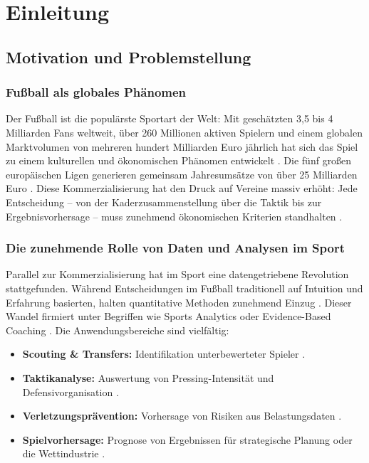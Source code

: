 \chapter{Einleitung}\label{chap:einleitung}

\section{Motivation und Problemstellung}

\subsection{Fußball als globales Phänomen}

Der Fußball ist die populärste Sportart der Welt: Mit geschätzten 3,5 bis
4 Milliarden Fans weltweit, über 260 Millionen aktiven Spielern und einem
globalen Marktvolumen von mehreren hundert Milliarden Euro jährlich hat
sich das Spiel zu einem kulturellen und ökonomischen Phänomen entwickelt
\cite{Szymanski2003,Statista2024}. Die fünf großen europäischen Ligen
generieren gemeinsam Jahresumsätze von über 25 Milliarden Euro
\cite{DFL2024}. Diese Kommerzialisierung hat den Druck auf Vereine massiv
erhöht: Jede Entscheidung -- von der Kaderzusammenstellung über die Taktik
bis zur Ergebnisvorhersage -- muss zunehmend ökonomischen Kriterien
standhalten \cite{DobsonGoddard2011}.

\subsection{Die zunehmende Rolle von Daten und Analysen im Sport}

Parallel zur Kommerzialisierung hat im Sport eine datengetriebene Revolution
stattgefunden. Während Entscheidungen im Fußball traditionell auf Intuition
und Erfahrung basierten, halten quantitative Methoden zunehmend Einzug
\cite{ReinMemmert2016}. Dieser Wandel firmiert unter Begriffen wie
\glqq Sports Analytics\grqq{} oder \glqq Evidence-Based Coaching\grqq{}
\cite{BunkerThabtah2019}. Die Anwendungsbereiche sind vielfältig:

\begin{itemize}
    \item \textbf{Scouting \& Transfers:} Identifikation unterbewerteter
          Spieler \cite{PappalardoEtAl2019}.
    \item \textbf{Taktikanalyse:} Auswertung von Pressing-Intensität und
          Defensivorganisation \cite{MemmertLemminkSampaio2017}.
    \item \textbf{Verletzungsprävention:} Vorhersage von Risiken aus
          Belastungsdaten \cite{Csercsik2020}.
    \item \textbf{Spielvorhersage:} Prognose von Ergebnissen für strategische
          Planung oder die Wettindustrie \cite{HubacekSourekZelezny2019}.
\end{itemize}

